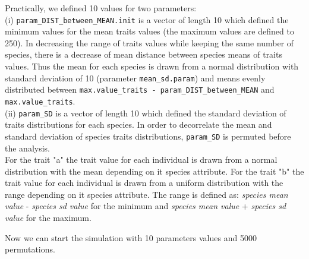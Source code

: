 \documentclass[12pt]{article}\usepackage[]{graphicx}\usepackage[]{color}
\begin{document}
 Practically, we defined 10 values for two parameters:
\\

 (i) \texttt{param\_{}DIST\_{}between\_{}MEAN.init} is a vector of length 10 which defined the minimum values for the mean traits values (the maximum values are defined to 250). In decreasing the range of traits values while keeping the same number of species, there is a decrease of mean distance between species means of traits values. Thus the mean for each species is drawn from a normal distribution with standard deviation of 10 (parameter \texttt{mean\_{}sd.param}) and means evenly distributed between \texttt{max.value\_{}traits - param\_{}DIST\_{}between\_{}MEAN} and \texttt{max.value\_{}traits}.
\\

(ii) \texttt{param\_{}SD} is a vector of length 10 which defined the standard deviation of traits distributions for each species. In order to decorrelate the mean and standard deviation of species traits distributions, \texttt{param\_{}SD} is permuted before the analysis. 
\\

For the trait "a" the trait value for each individual is drawn from a normal distribution with the mean depending on it species attribute. For the trait "b" the trait value for each individual is drawn from a uniform distribution with the range depending on it species attribute. The range is defined as: \textit{species mean value} - \textit{species sd value} for the minimum and \textit{species mean value} + \textit{species sd value} for the maximum.

Now we can start the simulation with 10 parameters values and 5000 permutations. 
\end{document}
